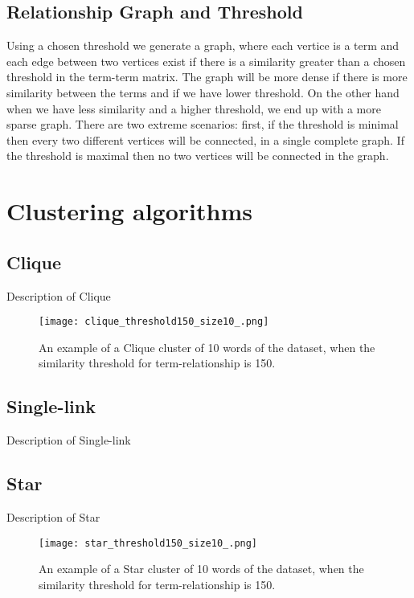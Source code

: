 \documentclass{article}
\begin{document}
\subsection{Relationship Graph and Threshold}

Using a chosen threshold we generate a graph, where each vertice is a term and each edge between two vertices exist if there is a similarity greater than a chosen threshold in the term-term matrix. The graph will be more dense if there is more similarity between the terms and if we have lower threshold. On the other hand when we have less similarity and a higher threshold, we end up with a more sparse graph. There are two extreme scenarios: first, if the threshold is minimal then every two different vertices will be connected, in a single complete graph. If the threshold is maximal then no two vertices will be connected in the graph. 

\section{Clustering algorithms}



\subsection{Clique}
Description of Clique

\begin{figure}[H]
    \centering
    \texttt{[image: clique\_threshold150\_size10\_.png]}
    \caption{An example of a Clique cluster of 10 words of the dataset, when the similarity threshold for term-relationship is 150.}
    \label{fig:example_clique}
\end{figure}

\subsection{Single-link}
Description of Single-link


\subsection{Star}
Description of Star

\begin{figure}[H]
    \centering
    \texttt{[image: star\_threshold150\_size10\_.png]}
    \caption{An example of a Star cluster of 10 words of the dataset, when the similarity threshold for term-relationship is 150.}
    \label{fig:example_star}
\end{figure}
\end{document}
